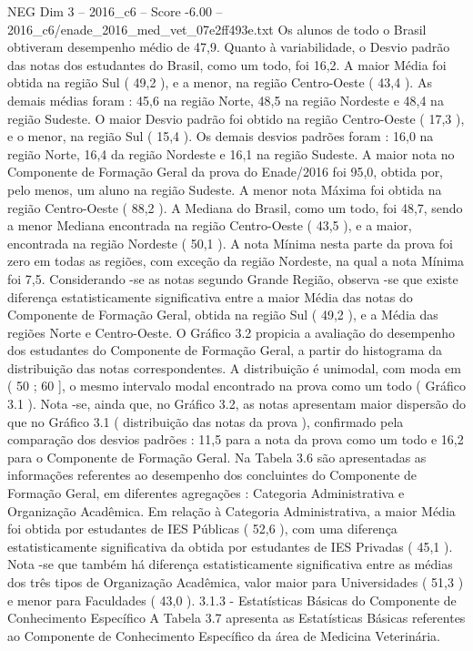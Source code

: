 \begin{textsample}{NEG Dim 3 – 2016\_c6 – Score -6.00 – 2016\_c6/enade\_2016\_med\_vet\_07e2ff493e.txt}
Os alunos de todo o Brasil obtiveram desempenho médio de 47,9.
Quanto à variabilidade, o Desvio padrão das notas dos estudantes do Brasil, como um todo, foi 16,2.
A maior Média foi obtida na região Sul ( 49,2 ), e a menor, na região Centro-Oeste ( 43,4 ).
As demais médias foram : 45,6 na região Norte, 48,5 na região Nordeste e 48,4 na região Sudeste.
O maior Desvio padrão foi obtido na região Centro-Oeste ( 17,3 ), e o menor, na região Sul ( 15,4 ).
Os demais desvios padrões foram : 16,0 na região Norte, 16,4 da região Nordeste e 16,1 na região Sudeste.
A maior nota no Componente de Formação Geral da prova do Enade/2016 foi 95,0, obtida por, pelo menos, um aluno na região Sudeste.
A menor nota Máxima foi obtida na região Centro-Oeste ( 88,2 ).
A Mediana do Brasil, como um todo, foi 48,7, sendo a menor Mediana encontrada na região Centro-Oeste ( 43,5 ), e a maior, encontrada na região Nordeste ( 50,1 ).
A nota Mínima nesta parte da prova foi zero em todas as regiões, com exceção da região Nordeste, na qual a nota Mínima foi 7,5.
Considerando -se as notas segundo Grande Região, observa -se que existe diferença estatisticamente significativa entre a maior Média das notas do Componente de Formação Geral, obtida na região Sul ( 49,2 ), e a Média das regiões Norte e Centro-Oeste.
O Gráfico 3.2 propicia a avaliação do desempenho dos estudantes do Componente de Formação Geral, a partir do histograma da distribuição das notas correspondentes.
A distribuição é unimodal, com moda em ( 50 ; 60 ], o mesmo intervalo modal encontrado na prova como um todo ( Gráfico 3.1 ).
Nota -se, ainda que, no Gráfico 3.2, as notas apresentam maior dispersão do que no Gráfico 3.1 ( distribuição das notas da prova ), confirmado pela comparação dos desvios padrões : 11,5 para a nota da prova como um todo e 16,2 para o Componente de Formação Geral.
Na Tabela 3.6 são apresentadas as informações referentes ao desempenho dos concluintes do Componente de Formação Geral, em diferentes agregações : Categoria Administrativa e Organização Acadêmica.
Em relação à Categoria Administrativa, a maior Média foi obtida por estudantes de IES Públicas ( 52,6 ), com uma diferença estatisticamente significativa da obtida por estudantes de IES Privadas ( 45,1 ).
Nota -se que também há diferença estatisticamente significativa entre as médias dos três tipos de Organização Acadêmica, valor maior para Universidades ( 51,3 ) e menor para Faculdades ( 43,0 ). 3.1.3 - Estatísticas Básicas do Componente de Conhecimento Específico A Tabela 3.7 apresenta as Estatísticas Básicas referentes ao Componente de Conhecimento Específico da área de Medicina Veterinária.

\end{textsample}
